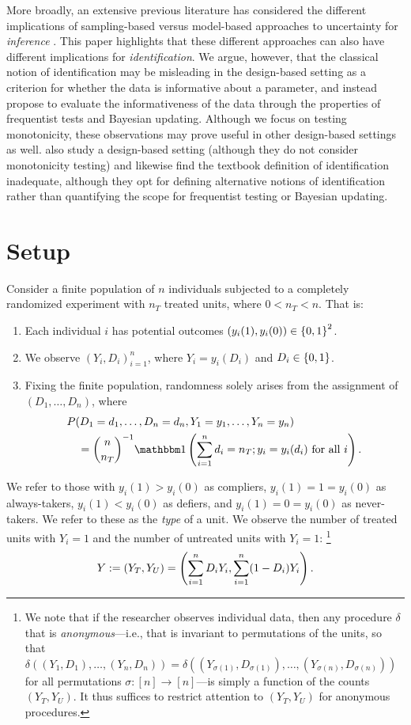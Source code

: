 \documentclass[12pt,reqno]{amsart}
\theoremstyle{theorem}
\theoremstyle{definition}
\newcommand{\0}{\mathbf{0}}
\newcommand{\1}{\mathbf{1}}
\begin{document}
More broadly, an extensive previous literature has considered the different implications
of sampling-based versus model-based approaches to uncertainty for \emph{inference}
\citep[e.g.][]{li_general_2017,abadie_sampling-based_2020}. This paper highlights that
these different approaches can also have different implications for \emph{identification}.
We argue, however, that the classical notion of identification may be misleading in the
design-based setting as a criterion for whether the data is informative about a parameter,
and instead propose to evaluate the informativeness of the data through the properties of
frequentist tests and Bayesian updating. Although we focus on testing monotonicity, these
observations may prove useful in other design-based settings as well. \citet{kline2025finite} also study a design-based setting (although they do not consider monotonicity testing) and likewise find the textbook definition of identification inadequate, although they opt for defining alternative notions of identification rather than quantifying the scope for frequentist testing or Bayesian updating.

\section{Setup}
\label{sec:setup}
Consider a finite population of $n$ individuals subjected to a completely randomized
experiment with $n_T$ treated units, where $0 < n_T < n$. That is:
\begin{enumerate}
    \item Each individual $i$ has
potential outcomes $(y_i(1), y_i(0)) \in \left\{{0,1}\right\}^2$.
\item We observe $(Y_i, D_i)_
{i=1}^n$, where $Y_i = y_i(D_i)$ and $D_i \in \left\{{0,1}\right\}$.
\item Fixing the finite
population, randomness solely arises from
the assignment of $(D_1,\ldots, D_n)$, where \begin{align*}
&P(D_1=d_1,\ldots, D_n=d_n, Y_1=y_1,\ldots, Y_n = y_n) \\&\quad= \binom{n}{n_T}^{-1} \one
\pr{\sum_
{i=1}^n d_i = n_T; y_i = y_i(d_i) \text{ for all $i$}}.
\end{align*}
\end{enumerate}
We refer to those with $y_i(1) > y_i(0)$ as compliers, $y_i(1) =  1 = y_i(0)$ as always-takers, $y_i(1) < y_i(0)$ as defiers, and $y_i(1) = 0 = y_i(0)$ as
 never-takers.
 We refer to these as the \emph{type} of a unit. We observe the number of treated units with $Y_i=1$ and the number of
untreated units with $Y_i=1$:%
\footnote{We note that if the researcher observes individual data, then any procedure $\delta$ that is \emph{anonymous}---i.e., that is invariant to permutations of the units, so that $\delta((Y_1,D_1),\ldots, (Y_n, D_n)) = \delta((Y_{\sigma(1)}, D_{\sigma(1)}),
\ldots, (Y_{\sigma(n)}, D_{\sigma(n)}))$ for all permutations $\sigma: [n] \to [n]$---is simply a function of the counts $(Y_T,Y_U)$. It thus suffices to restrict attention to $(Y_T,Y_U)$ for anonymous procedures.}
\[
Y := (Y_T, Y_U) = \left(\sum_{i=1}^n D_i Y_i, \sum_{i=1}^n (1-D_i) Y_i\right). 
\]
 
\end{document}
